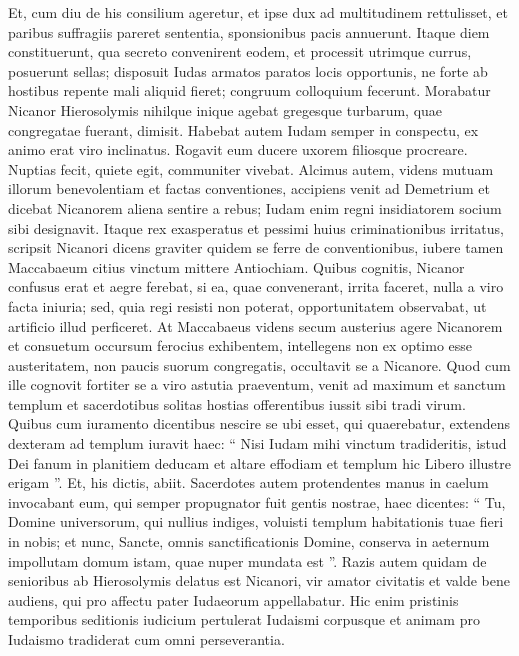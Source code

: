 \begin{biblechapter}
\begin{biblechapter}
\begin{biblechapter}
\begin{biblechapter}
\begin{biblechapter}
\begin{biblechapter}
\begin{biblechapter}
\begin{biblechapter}
\begin{biblechapter}
\begin{biblechapter}
\begin{biblechapter}
\begin{biblechapter}
\begin{biblechapter}
\begin{biblechapter}
\verse Et, cum diu de his consilium ageretur, et ipse dux ad multitudinem rettulisset, et paribus suffragiis pareret sententia, sponsionibus pacis annuerunt. 
\verse Itaque diem constituerunt, qua secreto convenirent eodem, et processit utrimque currus, posuerunt sellas; 
\verse disposuit Iudas armatos paratos locis opportunis, ne forte ab hostibus repente mali aliquid fieret; congruum colloquium fecerunt. 
\verse Morabatur Nicanor Hierosolymis nihilque inique agebat gregesque turbarum, quae congregatae fuerant, dimisit. 
 \verse Habebat autem Iudam semper in conspectu, ex animo erat viro inclinatus. 
 \verse Rogavit eum ducere uxorem filiosque procreare. Nuptias fecit, quiete egit, communiter vivebat.
 \verse Alcimus autem, videns mutuam illorum benevolentiam et factas conventiones, accipiens venit ad Demetrium et dicebat Nicanorem aliena sentire a rebus; Iudam enim regni insidiatorem socium sibi designavit. 
\verse Itaque rex exasperatus et pessimi huius criminationibus irritatus, scripsit Nicanori dicens graviter quidem se ferre de conventionibus, iubere tamen Maccabaeum citius vinctum mittere Antiochiam. 
\verse Quibus cognitis, Nicanor confusus erat et aegre ferebat, si ea, quae convenerant, irrita faceret, nulla a viro facta iniuria; 
 \verse sed, quia regi resisti non poterat, opportunitatem observabat, ut artificio illud perficeret. 
\verse At Maccabaeus videns secum austerius agere Nicanorem et consuetum occursum ferocius exhibentem, intellegens non ex optimo esse austeritatem, non paucis suorum congregatis, occultavit se a Nicanore. 
\verse Quod cum ille cognovit fortiter se a viro astutia praeventum, venit ad maximum et sanctum templum et sacerdotibus solitas hostias offerentibus iussit sibi tradi virum. 
\verse Quibus cum iuramento dicentibus nescire se ubi esset, qui quaerebatur, extendens dexteram ad templum 
\verse iuravit haec: “ Nisi Iudam mihi vinctum tradideritis, istud Dei fanum in planitiem deducam et altare effodiam et templum hic Libero illustre erigam ”. 
\verse Et, his dictis, abiit. Sacerdotes autem protendentes manus in caelum invocabant eum, qui semper propugnator fuit gentis nostrae, haec dicentes: 
\verse “ Tu, Domine universorum, qui nullius indiges, voluisti templum habitationis tuae fieri in nobis; \verse et nunc, Sancte, omnis sanctificationis Domine, conserva in aeternum impollutam domum istam, quae nuper mundata est ”.
 \verse Razis autem quidam de senioribus ab Hierosolymis delatus est Nicanori, vir amator civitatis et valde bene audiens, qui pro affectu pater Iudaeorum appellabatur. 
\verse Hic enim pristinis temporibus seditionis iudicium pertulerat Iudaismi corpusque et animam pro Iudaismo tradiderat cum omni perseverantia. 

\end{biblechapter}
\end{biblechapter}
\end{biblechapter}
\end{biblechapter}
\end{biblechapter}
\end{biblechapter}
\end{biblechapter}
\end{biblechapter}
\end{biblechapter}
\end{biblechapter}
\end{biblechapter}
\end{biblechapter}
\end{biblechapter}
\end{biblechapter}

